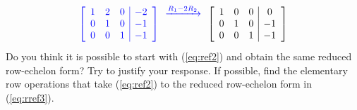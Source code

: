 \documentclass{ximera}
\begin{document}
\begin{exploration}
$$\begin{array}{c}
\\
 \end{array}$$
\begin{equation}\label{eq:rref3}  \color{blue}
 \left[\begin{array}{ccc|c}  
 1&2&0&-2\\0&1&0&-1\\0&0&1&-1
 \end{array}\right]
  \begin{array}{c}
  \xrightarrow{R_1-2R_2}\\
 \\
\\
 \end{array}
 \color{black}
  \left[\begin{array}{ccc|c}  
 1&0&0&0\\0&1&0&-1\\0&0&1&-1
 \end{array}\right]\end{equation}
Do you think it is possible to start with (\ref{eq:ref2}) and obtain the same reduced row-echelon form?  Try to justify your response.  If possible, find the elementary row operations that take (\ref{eq:ref2}) to the reduced row-echelon form in (\ref{eq:rref3}).


\end{exploration}
\end{document}
